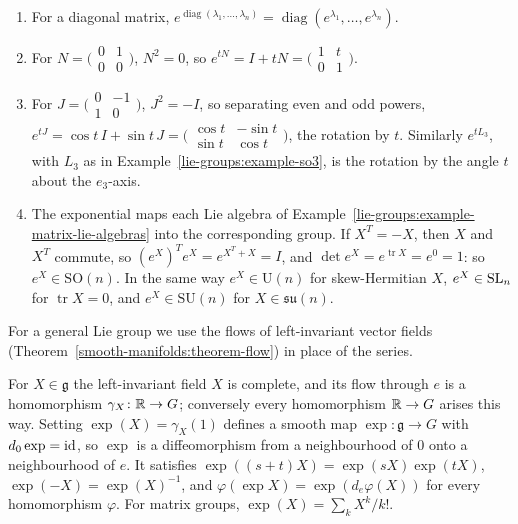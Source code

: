\begin{example}\label{lie-groups:example-exponentials}
\begin{enumerate}
\item For a diagonal matrix, $e^{\operatorname{diag}(\lambda_1, \ldots, \lambda_n)} = \operatorname{diag}(e^{\lambda_1}, \ldots, e^{\lambda_n})$.
\item For $N = \bigl(\begin{smallmatrix}0 & 1\\ 0 & 0\end{smallmatrix}\bigr)$, $N^2 = 0$, so $e^{tN} = I + tN = \bigl(\begin{smallmatrix}1 & t\\ 0 & 1\end{smallmatrix}\bigr)$.
\item For $J = \bigl(\begin{smallmatrix}0 & -1\\ 1 & 0\end{smallmatrix}\bigr)$, $J^2 = -I$, so separating even and odd powers,
$e^{tJ} = \cos t\,I + \sin t\,J = \bigl(\begin{smallmatrix}\cos t & -\sin t\\ \sin t & \cos t\end{smallmatrix}\bigr)$, the rotation by $t$. Similarly
$e^{tL_3}$, with $L_3$ as in Example~\ref{lie-groups:example-so3}, is the rotation by the angle $t$ about the $e_3$-axis.
\item The exponential maps each Lie algebra of Example~\ref{lie-groups:example-matrix-lie-algebras} into the corresponding group. If $X^T = -X$, then $X$ and
$X^T$ commute, so $(e^X)^Te^X = e^{X^T + X} = I$, and $\det e^X = e^{\operatorname{tr}X} = e^0 = 1$: so $e^X \in \mathrm{SO}(n)$. In the same way $e^X \in \mathrm{U}(n)$
for skew-Hermitian $X$, $e^X \in \mathrm{SL}_n$ for $\operatorname{tr}X = 0$, and $e^X \in \mathrm{SU}(n)$ for $X \in \mathfrak{su}(n)$.
\end{enumerate}
\end{example}

For a general Lie group we use the flows of left-invariant vector fields (Theorem~\ref{smooth-manifolds:theorem-flow}) in place of the series.

\begin{theorem}\label{lie-groups:theorem-exponential}
For $X \in \mathfrak{g}$ the left-invariant field $X$ is complete, and its flow through $e$ is a homomorphism $\gamma_X \colon \mathbb{R} \to G$; conversely every homomorphism $\mathbb{R} \to G$ arises this way. Setting
$\exp(X) = \gamma_X(1)$ defines a smooth map $\exp \colon \mathfrak{g} \to G$ with $d_0\exp = \mathrm{id}$, so $\exp$ is a diffeomorphism from a neighbourhood of $0$ onto a neighbourhood of $e$. It satisfies
$\exp((s + t)X) = \exp(sX)\exp(tX)$, $\exp(-X) = \exp(X)^{-1}$, and $\varphi(\exp X) = \exp(d_e\varphi(X))$ for every homomorphism $\varphi$. For matrix groups, $\exp(X) = \sum_kX^k/k!$.
\end{theorem}

